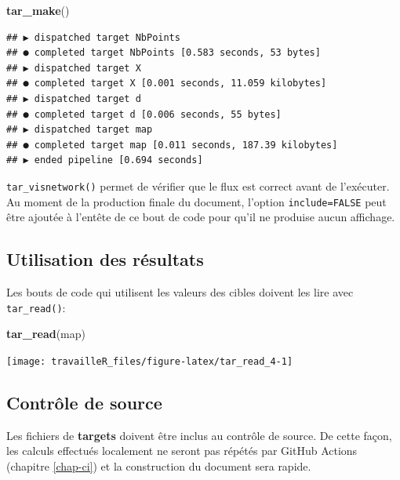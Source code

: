 \documentclass[
  12pt,
  french,
  a4paper,
  extrafontsizes,onecolumn,openright
  ]{memoir}
\newenvironment{Shaded}{\begin{snugshade}}{\end{snugshade}}
\newcommand{\FunctionTok}[1]{\textcolor[rgb]{0.13,0.29,0.53}{\textbf{#1}}}
\newcommand{\NormalTok}[1]{#1}
\begin{document}
\begin{Shaded}
\begin{Highlighting}[]
\FunctionTok{tar\_make}\NormalTok{()}
\end{Highlighting}
\end{Shaded}

\begin{verbatim}
## ▶ dispatched target NbPoints
## ● completed target NbPoints [0.583 seconds, 53 bytes]
## ▶ dispatched target X
## ● completed target X [0.001 seconds, 11.059 kilobytes]
## ▶ dispatched target d
## ● completed target d [0.006 seconds, 55 bytes]
## ▶ dispatched target map
## ● completed target map [0.011 seconds, 187.39 kilobytes]
## ▶ ended pipeline [0.694 seconds]
\end{verbatim}

\normalsize

\texttt{tar\_visnetwork()} permet de vérifier que le flux est correct avant de l'exécuter.
Au moment de la production finale du document, l'option \texttt{include=FALSE} peut être ajoutée à l'entête de ce bout de code pour qu'il ne produise aucun affichage.

\subsection{Utilisation des résultats}\label{utilisation-des-ruxe9sultats}

Les bouts de code qui utilisent les valeurs des cibles doivent les lire avec \texttt{tar\_read()}:

\scriptsize

\begin{Shaded}
\begin{Highlighting}[]
\FunctionTok{tar\_read}\NormalTok{(map)}
\end{Highlighting}
\end{Shaded}

\begin{center}\texttt{[image: travailleR\_files/figure-latex/tar\_read\_4-1]} \end{center}

\normalsize

\subsection{Contrôle de source}\label{contruxf4le-de-source}

Les fichiers de \textbf{targets} doivent être inclus au contrôle de source.
De cette façon, les calculs effectués localement ne seront pas répétés par GitHub Actions (chapitre \ref{chap-ci}) et la construction du document sera rapide.
\end{document}
